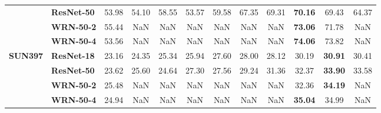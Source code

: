 \begin{table}
\begin{tabular}{l|l|cccccccccc}
       & \textbf{ResNet-50} &             53.98 & 54.10 & 58.55 & 53.57 & 59.58 & 67.35 & 69.31 & \textbf{70.16} & 69.43 & 64.37 \\
       & \textbf{WRN-50-2} &             55.44 &   NaN &   NaN &   NaN &   NaN &   NaN &   NaN & \textbf{73.06} & 71.78 &   NaN \\
       & \textbf{WRN-50-4} &             53.56 &   NaN &   NaN &   NaN &   NaN &   NaN &   NaN & \textbf{74.06} & 73.82 &   NaN \\
\cline{1-12}
\multirow{4}{*}{\textbf{SUN397}} & \textbf{ResNet-18} &             23.16 & 24.35 & 25.34 & 25.94 & 27.60 & 28.00 & 28.12 & 30.19 & \textbf{30.91} & 30.41 \\
       & \textbf{ResNet-50} &             23.62 & 25.60 & 24.64 & 27.30 & 27.56 & 29.24 & 31.36 & 32.37 & \textbf{33.90} & 33.58 \\
       & \textbf{WRN-50-2} &             25.48 &   NaN &   NaN &   NaN &   NaN &   NaN &   NaN & 32.36 & \textbf{34.19} &   NaN \\
       & \textbf{WRN-50-4} &             24.94 &   NaN &   NaN &   NaN &   NaN &   NaN &   NaN & \textbf{35.04} & 34.99 &   NaN \\
\bottomrule
\end{tabular}
\end{table}
